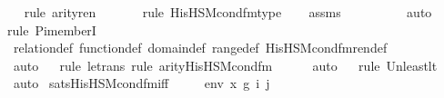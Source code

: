 \begin{isabellebody}
\ \ \isamarkupfalse%
{\isacharparenleft}{\kern0pt}rule\ arity{\isacharunderscore}{\kern0pt}ren{\isacharparenright}{\kern0pt}\isanewline
\ \ \ \ \ \ \isamarkupfalse%
{\isacharparenleft}{\kern0pt}rule\ His{\isacharunderscore}{\kern0pt}HS{\isacharunderscore}{\kern0pt}M{\isacharunderscore}{\kern0pt}cond{\isacharunderscore}{\kern0pt}fm{\isacharunderscore}{\kern0pt}type{\isacharparenright}{\kern0pt}\isanewline
\ \ \isamarkupfalse%
\ assms\ \isanewline
\ \ \ \ \ \ \ \isamarkupfalse%
\ auto{\isacharbrackleft}{\kern0pt}{}{\isacharbrackright}{\kern0pt}\ \isanewline
\ \ \ \isamarkupfalse%
{\isacharparenleft}{\kern0pt}rule\ Pi{\isacharunderscore}{\kern0pt}memberI{\isacharparenright}{\kern0pt}\isanewline
\ \ \isamarkupfalse%
\ relation{\isacharunderscore}{\kern0pt}def\ function{\isacharunderscore}{\kern0pt}def\ domain{\isacharunderscore}{\kern0pt}def\ range{\isacharunderscore}{\kern0pt}def\ His{\isacharunderscore}{\kern0pt}HS{\isacharunderscore}{\kern0pt}M{\isacharunderscore}{\kern0pt}cond{\isacharunderscore}{\kern0pt}fm{\isacharunderscore}{\kern0pt}ren{\isacharunderscore}{\kern0pt}def\ \isanewline
\ \ \ \ \ \ \isamarkupfalse%
\ auto{\isacharbrackleft}{\kern0pt}{}{\isacharbrackright}{\kern0pt}\isanewline
\ \ \isamarkupfalse%
{\isacharparenleft}{\kern0pt}rule\ le{\isacharunderscore}{\kern0pt}trans{\isacharcomma}{\kern0pt}\ rule\ arity{\isacharunderscore}{\kern0pt}His{\isacharunderscore}{\kern0pt}HS{\isacharunderscore}{\kern0pt}M{\isacharunderscore}{\kern0pt}cond{\isacharunderscore}{\kern0pt}fm{\isacharparenright}{\kern0pt}\isanewline
\ \ \ \ \isamarkupfalse%
\ auto{\isacharbrackleft}{\kern0pt}{}{\isacharbrackright}{\kern0pt}\isanewline
\ \ \isamarkupfalse%
{\isacharparenleft}{\kern0pt}rule\ Un{\isacharunderscore}{\kern0pt}least{\isacharunderscore}{\kern0pt}lt{\isacharparenright}{\kern0pt}\isanewline
\ \ \isamarkupfalse%
\ auto%
\endisatagproof
{\isafoldproof}%
%
\isadelimproof
\isanewline
%
\endisadelimproof
\isanewline
{}\isamarkupfalse%
\ sats{\isacharunderscore}{\kern0pt}His{\isacharunderscore}{\kern0pt}HS{\isacharunderscore}{\kern0pt}M{\isacharunderscore}{\kern0pt}cond{\isacharunderscore}{\kern0pt}fm{\isacharprime}{\kern0pt}{\isacharunderscore}{\kern0pt}iff\ {\isacharcolon}{\kern0pt}\ \isanewline
\ \ \ env\ x{\isacharprime}{\kern0pt}\ g\ i\ j\ \isanewline

\end{isabellebody}
